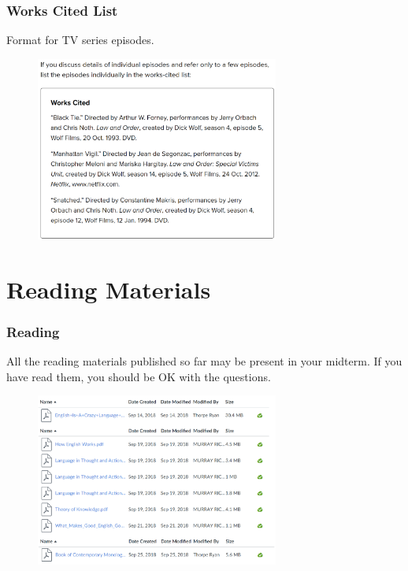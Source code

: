 \documentclass{beamer}
\begin{document}
\begin{frame}
\frametitle{Works Cited List}
Format for TV series episodes.
\begin{figure}[!htbp]
\center
\includegraphics[width=8cm]{episode.png}
\end{figure}
\end{frame}
\section{Reading Materials}
\begin{frame}
\frametitle{Reading}
All the reading materials published so far may be present in your midterm. If you have read them, you should be OK with the questions.
\begin{figure}[!htbp]
\center
\includegraphics[width=8cm]{reading.png}
\end{figure}
\end{frame}
\end{document}
